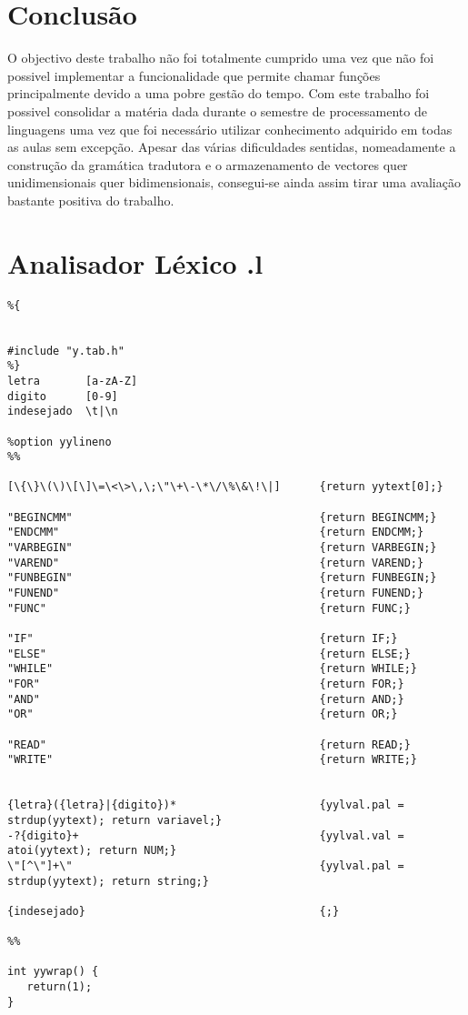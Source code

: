 \documentclass{report}
\begin{document}
\section{Conclusão}
O objectivo deste trabalho não foi totalmente cumprido uma vez que não foi possivel implementar a funcionalidade que permite chamar funções  principalmente devido a uma pobre gestão do tempo.
Com este trabalho foi possivel consolidar a matéria dada durante o semestre de processamento de linguagens uma vez que foi necessário utilizar conhecimento adquirido em todas as aulas sem excepção.
Apesar das várias dificuldades sentidas, nomeadamente a construção da gramática tradutora e o armazenamento de vectores quer unidimensionais quer bidimensionais, consegui-se ainda assim tirar uma avaliação bastante positiva do trabalho.




\appendix
\section{Analisador Léxico .l}

\begin{lstlisting}
%{


#include "y.tab.h"
%}
letra       [a-zA-Z]
digito      [0-9]
indesejado  \t|\n

%option yylineno
%%

[\{\}\(\)\[\]\=\<\>\,\;\"\+\-\*\/\%\&\!\|]      {return yytext[0];}

"BEGINCMM"				                        {return BEGINCMM;}
"ENDCMM"				                        {return ENDCMM;}
"VARBEGIN"				                        {return VARBEGIN;}
"VAREND"				                        {return VAREND;}
"FUNBEGIN"				                        {return FUNBEGIN;}
"FUNEND"				                        {return FUNEND;}
"FUNC"					                        {return FUNC;}

"IF"					                        {return IF;}
"ELSE"					                        {return ELSE;}
"WHILE"					                        {return WHILE;}
"FOR"					                        {return FOR;}
"AND"											{return AND;}
"OR"											{return OR;}

"READ"					                        {return READ;}
"WRITE"					                        {return WRITE;}


{letra}({letra}|{digito})*                      {yylval.pal = strdup(yytext); return variavel;}
-?{digito}+ 				                    {yylval.val = atoi(yytext); return NUM;}
\"[^\"]+\"										{yylval.pal = strdup(yytext); return string;}

{indesejado}                                    {;}

%%

int yywrap() {
   return(1);
}
\end{lstlisting}
\end{document}
